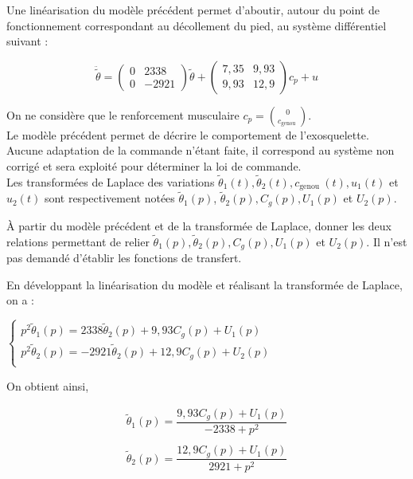 Une linéarisation du modèle précédent permet d'aboutir, autour du point de fonctionnement correspondant au décollement du pied, au système différentiel suivant :

$$
\ddot{\tilde{\theta}}=\left(\begin{array}{cc}
0 & 2338 \\
0 & -2921
\end{array}\right) \tilde{\theta}+\left(\begin{array}{cc}
7,35 & 9,93 \\
9,93 & 12,9
\end{array}\right) c_{p}+u
$$

On ne considère que le renforcement musculaire $c_{p}=\binom{0}{c_{\text {genou }}}$.\\
Le modèle précédent permet de décrire le comportement de l'exosquelette. Aucune adaptation de la commande n'étant faite, il correspond au système non corrigé et sera exploité pour déterminer la loi de commande.\\
Les transformées de Laplace des variations $\tilde{\theta}_{1}(t), \tilde{\theta}_{2}(t), c_{\text {genou }}(t), u_{1}(t)$ et $u_{2}(t)$ sont respectivement notées $\tilde{\theta}_{1}(p)$, $\tilde{\theta}_{2}(p), C_{g}(p), U_{1}(p)$ et $U_{2}(p)$.\\

\begin{question}
\label{2023_ccs_psi_q_23} 
À partir du modèle précédent et de la transformée de Laplace, donner les deux relations permettant de relier $\tilde{\theta}_{1}(p), \tilde{\theta}_{2}(p), C_{g}(p), U_{1}(p)$ et $U_{2}(p)$. Il n'est pas demandé d'établir les fonctions de transfert.\\
\end{question}
\ifprof
\begin{corrige}
En développant la linéarisation du modèle et réalisant la transformée de Laplace, on a :

$
\left\{
\begin{array}{l}
p^2 \tilde{\theta}_1(p) = 2338 \tilde{\theta}_2(p) + 9,93 C_g(p) + U_1(p) \\
p^2 \tilde{\theta}_2(p) = -2921 \tilde{\theta}_2(p) + 12,9 C_g(p) + U_2(p) \\
\end{array}
\right.
$

On obtient ainsi,

\begin{align*}
\tilde{\theta}_1(p)=\dfrac{ 9,93 C_g(p) + U_1(p)}{-2338+p^2}\\
\\
\tilde{\theta}_2(p)=\dfrac{ 12,9 C_g(p) + U_1(p)}{2921+p^2}
\end{align*}
\end{corrige}
\else
\fi

